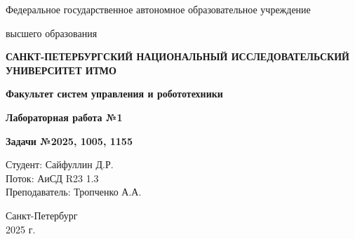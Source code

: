 \documentclass[a4paper,12pt]{article}
\begin{document}
\begin{titlepage}
    \centering
    {\large Федеральное государственное автономное образовательное учреждение\par}
    {\large высшего образования\par}
    {\bfseries САНКТ-ПЕТЕРБУРГСКИЙ НАЦИОНАЛЬНЫЙ ИССЛЕДОВАТЕЛЬСКИЙ УНИВЕРСИТЕТ ИТМО\par}
    {\bfseries Факультет систем управления и робототехники\par}
    \vfill
    {\Large \bfseries Лабораторная работа №1\par}
    {\Large \bfseries Задачи №2025, 1005, 1155\par}
    \vfill
    
    \begin{flushright}
        Студент: Сайфуллин Д.Р. \\
        Поток: АиСД R23 1.3 \\
        Преподаватель: Тропченко А.А.
    \end{flushright}
    \vfill
    Санкт-Петербург \\
    2025 г.
\end{titlepage}
\end{document}
